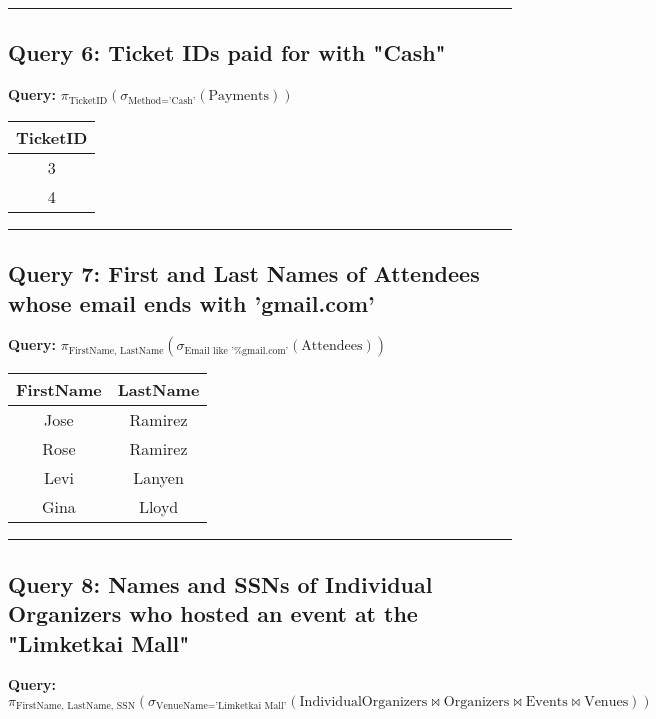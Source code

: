 \documentclass{article}
\begin{document}
\hrule

\subsection*{Query 6: Ticket IDs paid for with "Cash"}

\noindent \textbf{Query:} $\pi_{\text{TicketID}} \left( \sigma_{\text{Method='Cash'}} (\text{Payments}) \right)$

\begin{center}
\begin{tabular}{c}
\toprule
\textbf{TicketID} \\
\midrule
3 \\
4 \\
\bottomrule
\end{tabular}
\end{center}

\hrule

\subsection*{Query 7: First and Last Names of Attendees whose email ends with 'gmail.com'}

\noindent \textbf{Query:} $\pi_{\text{FirstName, LastName}} \left( \sigma_{\text{Email like '\%gmail.com'}} (\text{Attendees}) \right)$

\begin{center}
\begin{tabular}{cc}
\toprule
\textbf{FirstName} & \textbf{LastName} \\
\midrule
Jose & Ramirez \\
Rose & Ramirez \\
Levi & Lanyen \\
Gina & Lloyd \\
\bottomrule
\end{tabular}
\end{center}

\hrule

\subsection*{Query 8: Names and SSNs of Individual Organizers who hosted an event at the "Limketkai Mall"}

\noindent \textbf{Query:} $\pi_{\text{FirstName, LastName, SSN}} \left( \sigma_{\text{VenueName='Limketkai Mall'}} \left( \text{IndividualOrganizers} \bowtie \text{Organizers} \bowtie \text{Events} \bowtie \text{Venues} \right) \right)$
\end{document}
